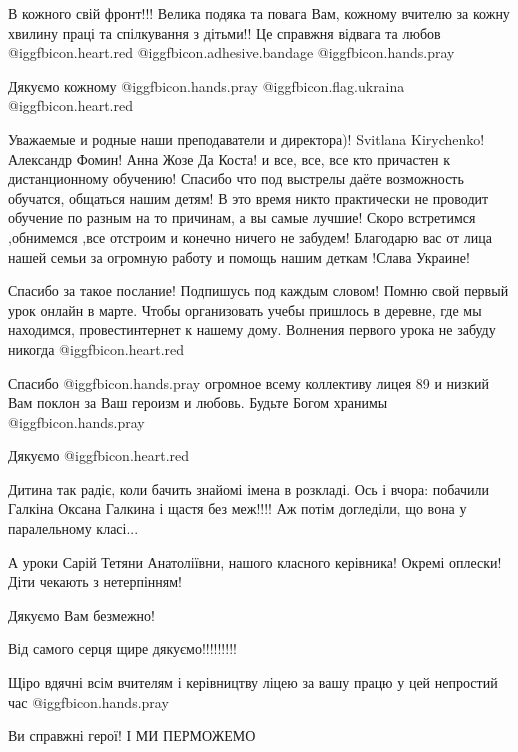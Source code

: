 \begin{itemize}
В кожного свій фронт!!! Велика подяка та повага Вам, кожному вчителю за кожну
хвилину праці та спілкування з дітьми!! Це справжня відвага та любов
@igg{fbicon.heart.red}  @igg{fbicon.adhesive.bandage}  @igg{fbicon.hands.pray} 

Дякуємо кожному  @igg{fbicon.hands.pray}  @igg{fbicon.flag.ukraina} @igg{fbicon.heart.red}


Уважаемые и родные наши преподаватели и директора)! Svitlana
Kirychenko! Александр Фомин! Анна Жозе Да Коста! и все, все, все кто причастен к
дистанционному обучению! Спасибо что под выстрелы даёте возможность
обучатся, общаться нашим детям! В это время никто практически не проводит
обучение по разным на то причинам, а вы самые лучшие! Скоро встретимся ,обнимемся
,все отстроим и конечно ничего не забудем! Благодарю вас от лица нашей семьи за
огромную работу и помощь нашим деткам !Слава Украине!


Спасибо за такое послание!
Подпишусь под каждым словом!
Помню свой первый урок онлайн в марте. Чтобы организовать учебы
пришлось в деревне, где мы находимся, провестинтернет к нашему дому.
Волнения первого урока не забуду никогда @igg{fbicon.heart.red}

Спасибо  @igg{fbicon.hands.pray}  огромное всему коллективу лицея 89 и низкий Вам поклон за Ваш героизм и любовь. Будьте Богом хранимы  @igg{fbicon.hands.pray} 

Дякуємо @igg{fbicon.heart.red}


Дитина так радіє, коли бачить знайомі імена в розкладі. Ось і вчора: побачили
Галкіна Оксана Галкина і щастя без меж!!!! Аж потім догледіли, що вона у
паралельному класі...

А уроки Сарій Тетяни Анатоліївни, нашого класного керівника! Окремі оплески!
Діти чекають з нетерпінням!

Дякуємо Вам безмежно!

Від самого серця щире дякуємо!!!!!!!!!


Щіро вдячні всім вчителям і керівництву ліцею за вашу працю у цей непростий час
 @igg{fbicon.hands.pray} 

Ви справжні герої! І МИ ПЕРМОЖЕМО


\end{itemize}
